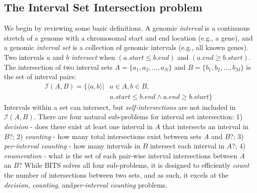 \documentclass{bioinfo}
\begin{document}
\subsection{The Interval Set Intersection problem}
We begin by reviewing some basic definitions.  A genomic \emph{interval} is a 
continuous stretch of a genome with a chromosomal start and end location 
(e.g., a gene), and a genomic \emph{interval set} is a collection of genomic 
intervals (e.g., all known genes).  
Two intervals $a$ and $b$ {\em intersect} when 
$(a.start \leq b.end)$ and $(a.end \geq b.start)$.  The intersection of two
interval sets $A=\{a_1, a_2, \dots, a_N\}$ and $B=\{b_1, b_2, \dots, b_M\}$ is
the set of interval pairs:
\vspace{-.75em}
\begin{equation*}
	\begin{split}
		\mathcal{I}(A,B)= \{ \langle a,b \rangle |& a \in A, b \in B, \\
		& a.start \leq b.end \wedge a.end \geq b.start\}
	\end{split}
\end{equation*}
Intervals within a set can intersect, but {\em self-intersections} are not
included in $\mathcal{I}(A,B)$.  
There are four natural sub-problems for interval set intersection: 1) 
\emph{decision} - does there exist at least one 
interval in $A$ that intersects an interval in $B$?; 2) {\em counting} - how 
many total intersections exist between sets $A$ and $B$?; 3) {\em 
per-interval counting} - how many intervals in $B$ intersect each interval in 
$A$?; 4) {\em enumeration} - what is the set of each pair-wise interval 
intersections between $A$ an $B$? While BITS solves all 
four sub-problems, it is designed to efficiently \emph{count} the number of 
intersections between two sets, and as such, it excels at the \emph{decision}, 
\emph{counting}, and\emph{per-interval counting} problems.
\end{document}
